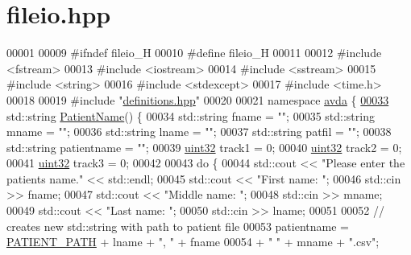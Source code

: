 \hypertarget{fileio_8hpp_source}{\section{fileio.\+hpp}
\label{fileio_8hpp_source}
}

\begin{DoxyCode}
00001 
00009 \textcolor{preprocessor}{#ifndef fileio\_H}
00010 \textcolor{preprocessor}{#define fileio\_H}
00011 
00012 \textcolor{preprocessor}{#include <fstream>}
00013 \textcolor{preprocessor}{#include <iostream>}
00014 \textcolor{preprocessor}{#include <sstream>}
00015 \textcolor{preprocessor}{#include <string>}
00016 \textcolor{preprocessor}{#include <stdexcept>}
00017 \textcolor{preprocessor}{#include <time.h>}
00018 
00019 \textcolor{preprocessor}{#include "\hyperlink{definitions_8hpp}{definitions.hpp}"}
00020 
00021 \textcolor{keyword}{namespace }\hyperlink{namespaceavda}{avda} \{
\hypertarget{fileio_8hpp_source_l00033}{}\hyperlink{namespaceavda_ae20728e7e8ae50bf2f74849e538841ea}{00033}     std::string \hyperlink{namespaceavda_ae20728e7e8ae50bf2f74849e538841ea}{PatientName}() \{
00034         std::string fname = \textcolor{stringliteral}{""};
00035         std::string mname = \textcolor{stringliteral}{""};
00036         std::string lname = \textcolor{stringliteral}{""};
00037         std::string patfil = \textcolor{stringliteral}{""};
00038         std::string patientname = \textcolor{stringliteral}{""};
00039         \hyperlink{definitions_8hpp_a1134b580f8da4de94ca6b1de4d37975e}{uint32} track1 = 0;
00040         \hyperlink{definitions_8hpp_a1134b580f8da4de94ca6b1de4d37975e}{uint32} track2 = 0;
00041         \hyperlink{definitions_8hpp_a1134b580f8da4de94ca6b1de4d37975e}{uint32} track3 = 0;
00042 
00043         \textcolor{keywordflow}{do} \{
00044             std::cout << \textcolor{stringliteral}{"Please enter the patients name."} << std::endl;
00045             std::cout << \textcolor{stringliteral}{"First name: "};
00046             std::cin >> fname;
00047             std::cout << \textcolor{stringliteral}{"Middle name: "};
00048             std::cin >> mname;
00049             std::cout << \textcolor{stringliteral}{"Last name: "};
00050             std::cin >> lname;
00051 
00052             \textcolor{comment}{// creates new std::string with path to patient file}
00053             patientname = \hyperlink{definitions_8hpp_a5736990e7ea949fc1971afa00e421f16}{PATIENT\_PATH} + lname + \textcolor{stringliteral}{", "} + fname
00054                 + \textcolor{stringliteral}{" "} + mname + \textcolor{stringliteral}{".csv"};

\end{DoxyCode}
